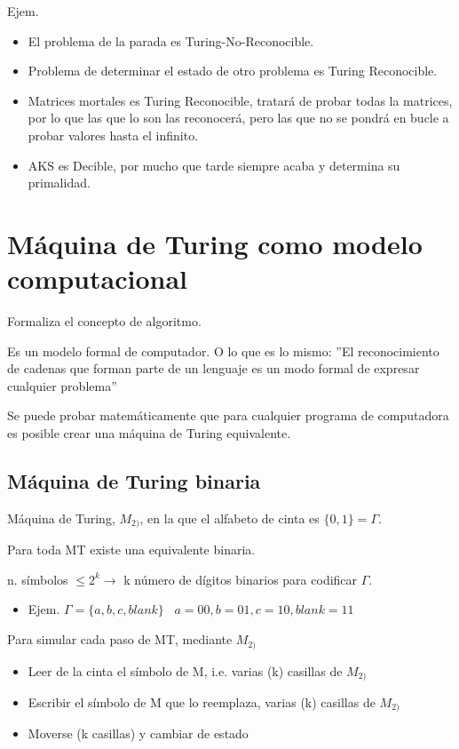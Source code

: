 Ejem.
\begin{itemize}
    \item El problema de la parada es Turing-No-Reconocible.
    \item Problema de determinar el estado de otro problema es Turing Reconocible.
    \item Matrices mortales es Turing Reconocible, tratará de probar todas la matrices, por lo que las que lo son las reconocerá, pero las que no se pondrá en bucle a probar valores hasta el infinito.
    \item AKS es Decible, por mucho que tarde siempre acaba y determina su primalidad.
\end{itemize}

\section{Máquina de Turing como modelo computacional}
Formaliza el concepto de algoritmo.

Es un modelo formal de computador. O lo que es lo mismo: ''El reconocimiento de cadenas que forman parte de un lenguaje es un modo formal de expresar cualquier problema''

Se puede probar matemáticamente que para cualquier programa de computadora es posible crear una máquina de Turing equivalente.

\subsection{Máquina de Turing binaria}
Máquina de Turing, $M_{2)}$, en la que el alfabeto de cinta es $\{0,1\}=\Gamma$.

Para toda MT existe una equivalente binaria.

n. símbolos $\leq 2^k \rightarrow$ k número de dígitos binarios para codificar $\Gamma$.
\begin{itemize}
    \item Ejem. $\Gamma = \{a, b, c, blank \}\;\;\; a=00, b=01, c=10, \textit{blank}=11$ 
\end{itemize}

Para simular cada paso de MT, mediante $M_{2)}$ 
\begin{itemize}
    \item Leer de la cinta el símbolo de M, i.e. varias (k) casillas de $M_{2)}$
    \item Escribir el símbolo de M que lo reemplaza, varias (k) casillas de $M_{2)}$
    \item Moverse (k casillas) y cambiar de estado
\end{itemize}

